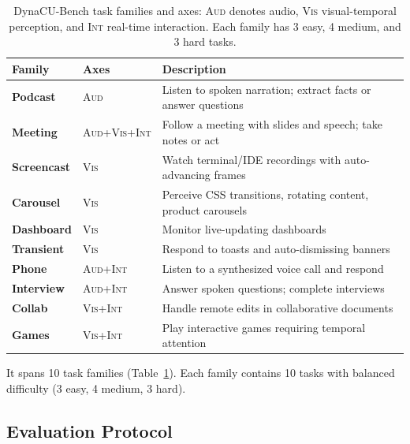 \documentclass[letterpaper]{article} %
\begin{document}
\begin{table}[t]
\centering
\begin{tabular}{@{}llp{8.0cm}@{}}
\toprule
\textbf{Family} & \textbf{Axes} & \textbf{Description} \\
\midrule
\textbf{Podcast}   & \textsc{Aud}             & Listen to spoken narration; extract facts or answer questions \\
\textbf{Meeting}   & \textsc{Aud+Vis+Int}     & Follow a meeting with slides and speech; take notes or act \\
\textbf{Screencast}& \textsc{Vis}             & Watch terminal/IDE recordings with auto-advancing frames \\
\textbf{Carousel}  & \textsc{Vis}             & Perceive CSS transitions, rotating content, product carousels \\
\textbf{Dashboard} & \textsc{Vis}             & Monitor live-updating dashboards \\
\textbf{Transient} & \textsc{Vis}             & Respond to toasts and auto-dismissing banners \\
\textbf{Phone}     & \textsc{Aud+Int}         & Listen to a synthesized voice call and respond \\
\textbf{Interview} & \textsc{Aud+Int}         & Answer spoken questions; complete interviews \\
\textbf{Collab}    & \textsc{Vis+Int}         & Handle remote edits in collaborative documents \\
\textbf{Games}     & \textsc{Vis+Int}         & Play interactive games requiring temporal attention \\
\bottomrule
\end{tabular}
\caption{DynaCU-Bench task families and axes: \textsc{Aud} denotes audio,
\textsc{Vis} visual-temporal perception, and \textsc{Int} real-time interaction.
Each family has 3 easy, 4 medium, and 3 hard tasks.}
\label{tab:categories}
\end{table}

It spans 10 task families (Table~\ref{tab:categories}). Each family contains 10 tasks with balanced difficulty (3 easy, 4 medium, 3 hard).

\subsection{Evaluation Protocol}
\label{sec:evaluation-protocol}
\end{document}
